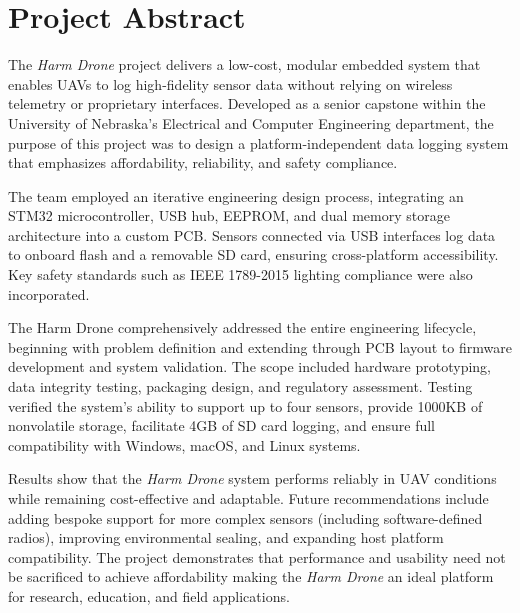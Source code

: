 \documentclass[../main.tex]{subfiles}
\begin{document}
\section*{Project Abstract}

\par The \textit{Harm Drone} project delivers a low-cost, modular embedded system that enables UAVs to log high-fidelity sensor data without relying on wireless telemetry or proprietary interfaces. Developed as a senior capstone within the University of Nebraska’s Electrical and Computer Engineering department, the purpose of this project was to design a platform-independent data logging system that emphasizes affordability, reliability, and safety compliance.

\par The team employed an iterative engineering design process, integrating an STM32 microcontroller, USB hub, EEPROM, and dual memory storage architecture into a custom PCB. Sensors connected via USB interfaces log data to onboard flash and a removable SD card, ensuring cross-platform accessibility. Key safety standards such as IEEE 1789-2015 lighting compliance were also incorporated.

\par The Harm Drone comprehensively addressed the entire engineering lifecycle, beginning with problem definition and extending through PCB layout to firmware development and system validation. The scope included hardware prototyping, data integrity testing, packaging design, and regulatory assessment. Testing verified the system's ability to support up to four sensors, provide 1000KB of nonvolatile storage, facilitate 4GB of SD card logging, and ensure full compatibility with Windows, macOS, and Linux systems.

\par Results show that the \textit{Harm Drone} system performs reliably in UAV conditions while remaining cost-effective and adaptable. Future recommendations include adding bespoke support for more complex sensors (including software-defined radios), improving environmental sealing, and expanding host platform compatibility. The project demonstrates that performance and usability need not be sacrificed to achieve affordability making the \textit{Harm Drone} an ideal platform for research, education, and field applications.
\end{document}

